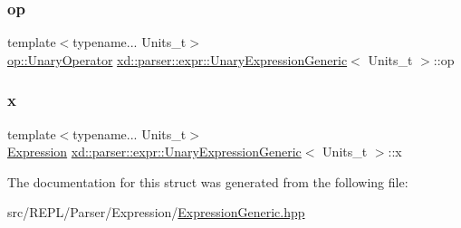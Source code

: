 \subsubsection{\texorpdfstring{op}{op}}
{\footnotesize\ttfamily template$<$typename... Units\+\_\+t$>$ \\
\mbox{\hyperlink{namespacexd_1_1parser_1_1expr_1_1op_ac61563bdf571a06b442d1fe819ff75bd}{op\+::\+Unary\+Operator}} \mbox{\hyperlink{structxd_1_1parser_1_1expr_1_1_unary_expression_generic}{xd\+::parser\+::expr\+::\+Unary\+Expression\+Generic}}$<$ Units\+\_\+t $>$\+::op}

\mbox{\label{structxd_1_1parser_1_1expr_1_1_unary_expression_generic_a07577b7ad1aa661354963ad8672a1315}} 
\subsubsection{\texorpdfstring{x}{x}}
{\footnotesize\ttfamily template$<$typename... Units\+\_\+t$>$ \\
\mbox{\hyperlink{structxd_1_1parser_1_1expr_1_1_expression_generic}{Expression}} \mbox{\hyperlink{structxd_1_1parser_1_1expr_1_1_unary_expression_generic}{xd\+::parser\+::expr\+::\+Unary\+Expression\+Generic}}$<$ Units\+\_\+t $>$\+::x}



The documentation for this struct was generated from the following file\+:\begin{DoxyCompactItemize}
\item 
src/\+R\+E\+P\+L/\+Parser/\+Expression/\mbox{\hyperlink{_expression_generic_8hpp}{Expression\+Generic.\+hpp}}\end{DoxyCompactItemize}

